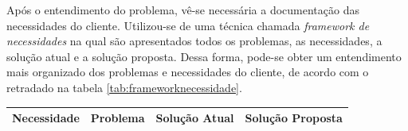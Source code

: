 Após o entendimento do problema, vê-se necessária a documentação das necessidades do cliente. Utilizou-se de uma técnica chamada \textit{framework de necessidades} na qual são apresentados todos os problemas, as necessidades, a solução atual e a solução proposta. Dessa forma, pode-se obter um entendimento mais organizado dos problemas e necessidades do cliente, de acordo com o retradado na tabela \ref{tab:frameworknecessidade}.

\begin{table}[H]
\centering
\begin{tabular}{|p{5cm}|p{3cm}|p{3cm}|p{5cm}|}

\hline
\textbf{Necessidade} &
\textbf{Problema} &
\textbf{Solução Atual} &
\textbf{Solução Proposta}
\\ \hline


\end{tabular}
\end{table}
